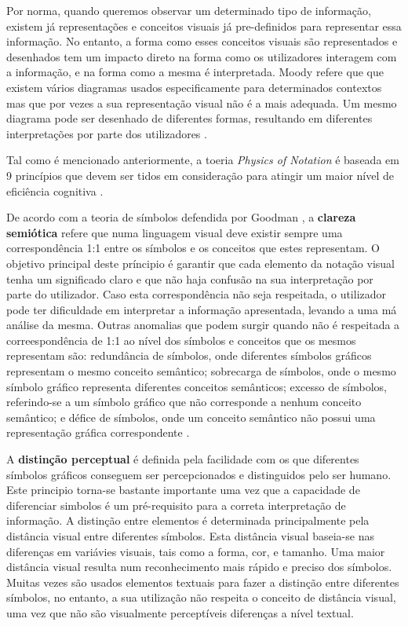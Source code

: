 Por norma, quando queremos observar um determinado tipo de informação, existem já representações e conceitos visuais já pre-definidos para representar essa informação. No entanto, a forma como esses conceitos visuais são representados e desenhados tem um impacto direto na forma como os utilizadores interagem com a informação, e na forma como a mesma é interpretada. Moody refere que que existem vários diagramas usados especificamente para determinados contextos mas que por vezes a sua representação visual não é a mais adequada. Um mesmo diagrama pode ser desenhado de diferentes formas, resultando em diferentes interpretações por parte dos utilizadores \cite{moody2009physics}. 

Tal como é mencionado anteriormente, a toeria \textit{Physics of Notation} é baseada em 9 princípios que devem ser tidos em consideração para atingir um maior nível de eficiência cognitiva \cite{moody2009physics}.

De acordo com a teoria de símbolos defendida por Goodman \cite{goodman1976languages}, a \textbf{clareza semiótica} refere que numa linguagem visual deve existir sempre uma correspondência 1:1 entre os símbolos e os conceitos que estes representam. O objetivo principal deste príncipio é garantir que cada elemento da notação visual tenha um significado claro e que não haja confusão na sua interpretação por parte do utilizador. Caso esta correspondência não seja respeitada, o utilizador pode ter dificuldade em interpretar a informação apresentada, levando a uma má análise da mesma. Outras anomalias que podem surgir quando não é respeitada a correespondência de 1:1 ao nível dos símbolos e conceitos que os mesmos representam são: redundância de símbolos, onde diferentes símbolos gráficos representam o mesmo conceito semântico; sobrecarga de símbolos, onde o mesmo símbolo gráfico representa diferentes conceitos semânticos; excesso de símbolos, referindo-se a um símbolo gráfico que não corresponde a nenhum conceito semântico; e défice de símbolos, onde um conceito semântico não possui uma representação gráfica correspondente \cite{moody2009physics}.

A \textbf{distinção perceptual} é definida pela facilidade com os que diferentes símbolos gráficos conseguem ser percepcionados e distinguidos pelo ser humano. Este principio torna-se bastante importante uma vez que a capacidade de diferenciar simbolos é um pré-requisito para a correta interpretação de informação. A distinção entre elementos é determinada principalmente pela distância visual entre diferentes símbolos. Esta distância visual baseia-se nas diferenças em variávies visuais, tais como a forma, cor, e tamanho. Uma maior distância visual resulta num reconhecimento mais rápido e preciso dos símbolos. Muitas vezes são usados elementos textuais para fazer a distinção entre diferentes símbolos, no entanto, a sua utilização não respeita o conceito de distância visual, uma vez que não são visualmente perceptíveis diferenças a nível textual.

